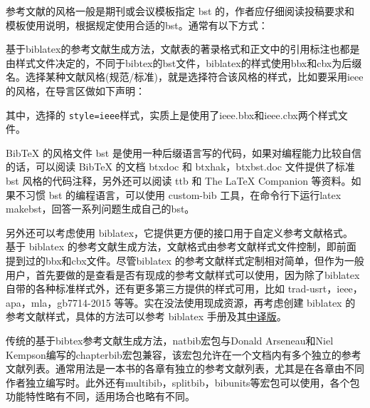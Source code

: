 
参考文献的风格一般是期刊或会议模板指定 bst 的，作者应仔细阅读投稿要求和模板使用说明，根据规定使用合适的bst。通常有以下方式：


基于biblatex的参考文献生成方法，文献表的著录格式和正文中的引用标注也都是由样式文件决定的，不同于bibtex的bst文件，biblatex的样式使用bbx和cbx为后缀名。选择某种文献风格(规范/标准)，就是选择符合该风格的样式，比如要采用ieee的风格，在导言区做如下声明：

\begin{texlist}
\usepackage[backend=biber,style=ieee]{biblatex}
\end{texlist}

其中，选择的 \verb|style=ieee|样式，实质上是使用了ieee.bbx和ieee.cbx两个样式文件。




BibTeX 的风格文件 bst 是使用一种后缀语言写的代码，如果对编程能力比较自信的话，可以阅读 BibTeX 的文档 btxdoc 和 btxhak，btxbst.doc 文件提供了标准 bst 风格的代码注释，另外还可以阅读 ttb 和 The LaTeX Companion 等资料。如果不习惯 bst 的编程语言，可以使用 custom-bib 工具，在命令行下运行latex makebst，回答一系列问题生成自己的bst。

另外还可以考虑使用 biblatex，它提供更方便的接口用于自定义参考文献格式。
基于 biblatex 的参考文献生成方法，文献格式由参考文献样式文件控制，即前面提到过的bbx和cbx文件。尽管biblatex 的参考文献样式定制相对简单，但作为一般用户，首先要做的是查看是否有现成的参考文献样式可以使用，因为除了biblatex自带的各种标准样式外，还有更多第三方提供的样式可用，比如 trad-usrt，ieee，apa，mla，gb7714-2015 等等。实在没法使用现成资源，再考虑创建 biblatex 的参考文献样式，具体的方法可以参考 biblatex 手册及其\href{https://github.com/hushidong/biblatex-zh-cn}{中译版}。






传统的基于bibtex参考文献生成方法，natbib宏包与Donald Arseneau和Niel Kempson编写的chapterbib宏包兼容，该宏包允许在一个文档内有多个独立的参考文献列表。通常用法是一本书的各章有独立的参考文献列表，尤其是在各章由不同作者独立编写时。此外还有multibib，splitbib，bibunits等宏包可以使用，各个包功能特性略有不同，适用场合也略有不同。

